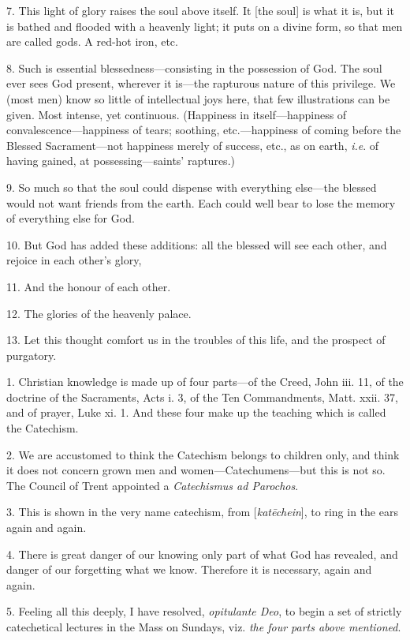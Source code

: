 7. This light of glory raises the soul above
itself. It [the soul] is what it is, but it is bathed and flooded with
a heavenly light; it puts on a divine form, so that men are called
gods. A red-hot iron, etc.

8. Such is essential blessedness—consisting in
the possession of God. The soul ever sees God present, wherever it
is—the rapturous nature of this privilege. We (most men) know so
little of intellectual joys here, that few illustrations can be given.
Most intense, yet continuous. (Happiness in itself—happiness of
convalescence—happiness of tears; soothing, etc.—happiness of
coming before the Blessed Sacrament—not happiness merely of success,
etc., as on earth, \emph{i.e}. of having gained, at
possessing—saints' raptures.)

9. So much so that the soul could dispense with
everything else—the blessed would not want friends from the earth.
Each could well bear to lose the memory of everything else for God.

10. But God has added these additions: all the
blessed will see each other, and rejoice in each other's glory,

11. And the honour of each other.

12. The glories of the heavenly palace.

13. Let this thought comfort us in the troubles
of this life, and the prospect of purgatory.


1. Christian knowledge is made up of four
parts—of the Creed, John iii. 11, of the doctrine of the Sacraments,
Acts i. 3, of the Ten Commandments, Matt. xxii. 37, and of prayer,
Luke xi. 1. And these four make up the teaching which is called the
Catechism.

2. We are accustomed to think the Catechism
belongs to children only, and think it does not concern grown men and
women—Catechumens—but this is not so. The Council of Trent
appointed a \emph{Catechismus ad Parochos}.

3. This is shown in the very name catechism, from
[\emph{kat\={e}chein}], to ring in the ears again and again.

4. There is great danger of our knowing only part
of what God has revealed, and danger of our forgetting what we know.
Therefore it is necessary, again and again.

5. Feeling all this deeply, I have resolved, \emph{opitulante
Deo}, to begin a set of strictly catechetical lectures in the Mass
on Sundays, viz. \emph{the four parts above mentioned}.

